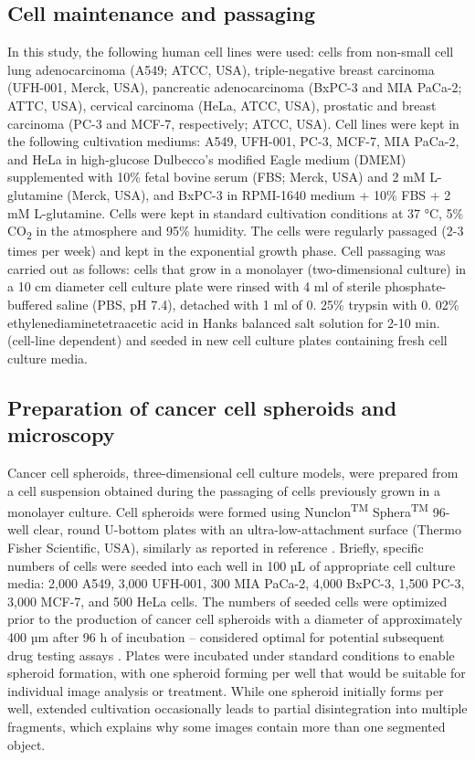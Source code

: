 \documentclass[preprint,12pt]{elsarticle}
\begin{document}
\subsection{Cell maintenance and passaging}
\label{subsec:cell_maintance}
In this study, the following human cell lines  were used: cells from non-small cell lung adenocarcinoma (A549; ATCC, USA), triple-negative breast carcinoma (UFH-001, Merck, USA), pancreatic adenocarcinoma (BxPC-3 and MIA PaCa-2; ATTC, USA), cervical carcinoma (HeLa, ATCC, USA), prostatic and breast carcinoma (PC-3 and MCF-7, respectively; ATCC, USA). Cell lines were kept in the following cultivation mediums: A549, UFH-001, PC-3, MCF-7, MIA PaCa-2, and HeLa in high-glucose Dulbecco's modified Eagle medium (DMEM) supplemented with 10\% fetal bovine serum (FBS; Merck, USA) and 2 mM L-glutamine (Merck, USA), and BxPC-3 in RPMI-1640 medium + 10\% FBS + 2 mM L-glutamine. Cells were kept in standard cultivation conditions at 37 °C, 5\% CO\textsubscript{2} in the atmosphere and 95\% humidity. The cells were regularly passaged (2-3 times per week) and kept in the exponential growth phase. Cell passaging was carried out as follows: cells that grow in a monolayer (two-dimensional culture) in a 10 cm diameter cell culture plate were rinsed with 4 ml of sterile phosphate-buffered saline (PBS, pH 7.4), detached with 1 ml of 0. 25\% trypsin with 0. 02\% ethylenediaminetetraacetic acid in Hanks balanced salt solution for 2-10 min. (cell-line dependent) and seeded in new cell culture plates containing fresh cell culture media.

\subsection{Preparation  of cancer cell spheroids and microscopy}
\label{subsec:preparation_of_cell}
Cancer cell spheroids, three-dimensional cell culture models, were prepared from a cell suspension obtained during the passaging of cells previously grown in a monolayer culture. Cell spheroids were formed using Nunclon\textsuperscript{TM} Sphera\textsuperscript{TM} 96-well clear, round U-bottom plates with an ultra-low-attachment surface (Thermo Fisher Scientific, USA), similarly as reported in reference \cite{2024zumaya}. Briefly, specific numbers of cells were seeded into each well in 100 µL of appropriate cell culture media: 2,000 A549, 3,000 UFH-001, 300 MIA PaCa-2, 4,000 BxPC-3, 1,500 PC-3, 3,000 MCF-7, and 500 HeLa cells. The numbers of seeded cells were optimized prior to the production of cancer cell spheroids with a diameter of approximately 400 µm after 96 h of incubation – considered optimal for potential subsequent drug testing assays \cite{2009friedrich}.  Plates were incubated under standard conditions to enable spheroid formation, with one spheroid forming per well that would be suitable for individual image analysis or treatment. While one spheroid initially forms per well, extended cultivation occasionally leads to partial disintegration into multiple fragments, which explains why some images contain more than one segmented object.
\end{document}

